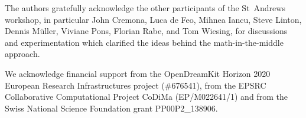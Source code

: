 The authors gratefully acknowledge the other participants of the St~Andrews workshop, in
particular John Cremona, Luca de Feo, Mihnea Iancu, Steve Linton, Dennis M\"uller, Viviane
Pons, Florian Rabe, and Tom Wiesing, for discussions and experimentation which clarified
the ideas behind the math-in-the-middle approach.

We acknowledge financial support from the OpenDreamKit Horizon 2020 European Research
Infrastructures project (\#676541), from the EPSRC Collaborative Computational Project
CoDiMa (EP/M022641/1) and from the Swiss National Science Foundation grant PP00P2\_138906.


